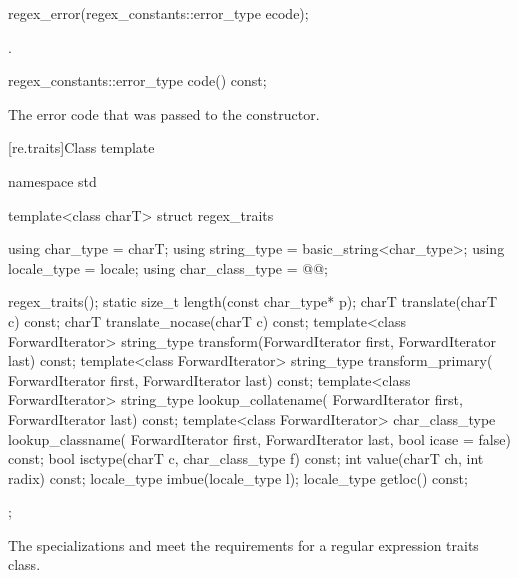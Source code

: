 %
\begin{itemdecl}
regex_error(regex_constants::error_type ecode);
\end{itemdecl}

\begin{itemdescr}
\pnum
\ensures
{}.
\end{itemdescr}

%
%
\begin{itemdecl}
regex_constants::error_type code() const;
\end{itemdecl}

\begin{itemdescr}
\pnum
\returns
The error code that was passed to the constructor.
\end{itemdescr}

[re.traits]{Class template }
%
\begin{codeblock}
namespace std {
  template<class charT>
    struct regex_traits {
      using char_type       = charT;
      using string_type     = basic_string<char_type>;
      using locale_type     = locale;
      using char_class_type = @@;

      regex_traits();
      static size_t length(const char_type* p);
      charT translate(charT c) const;
      charT translate_nocase(charT c) const;
      template<class ForwardIterator>
        string_type transform(ForwardIterator first, ForwardIterator last) const;
      template<class ForwardIterator>
        string_type transform_primary(
          ForwardIterator first, ForwardIterator last) const;
      template<class ForwardIterator>
        string_type lookup_collatename(
          ForwardIterator first, ForwardIterator last) const;
      template<class ForwardIterator>
        char_class_type lookup_classname(
          ForwardIterator first, ForwardIterator last, bool icase = false) const;
      bool isctype(charT c, char_class_type f) const;
      int value(charT ch, int radix) const;
      locale_type imbue(locale_type l);
      locale_type getloc() const;
    };
}
\end{codeblock}

\pnum
{}%
%
The specializations  and
 meet the
requirements for a regular expression traits class.

